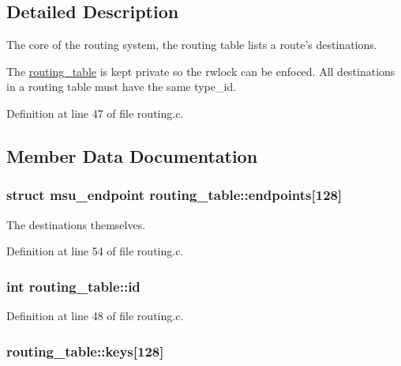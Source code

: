 \subsection{Detailed Description}
The core of the routing system, the routing table lists a route's destinations. 

The \hyperlink{structrouting__table}{routing\-\_\-table} is kept private so the rwlock can be enfoced. All destinations in a routing table must have the same type\-\_\-id. 

Definition at line 47 of file routing.\-c.



\subsection{Member Data Documentation}
\hypertarget{structrouting__table_a14e060336471c2720efcb502bdf0bce7}{
\subsubsection[{endpoints}]{\setlength{\rightskip}{0pt plus 5cm}struct {\bf msu\-\_\-endpoint} routing\-\_\-table\-::endpoints\mbox{[}128\mbox{]}}}\label{structrouting__table_a14e060336471c2720efcb502bdf0bce7}


The destinations themselves. 



Definition at line 54 of file routing.\-c.

\hypertarget{structrouting__table_a162359f4da0f31c95df59e2b51670d83}{
\subsubsection[{id}]{\setlength{\rightskip}{0pt plus 5cm}int routing\-\_\-table\-::id}}\label{structrouting__table_a162359f4da0f31c95df59e2b51670d83}


Definition at line 48 of file routing.\-c.

\hypertarget{structrouting__table_a488c5e77937df1e40c4b918093e50793}{
\subsubsection[{keys}]{ routing\-\_\-table\-::keys\mbox{[}128\mbox{]}}}\label{structrouting__table_a488c5e77937df1e40c4b918093e50793}


